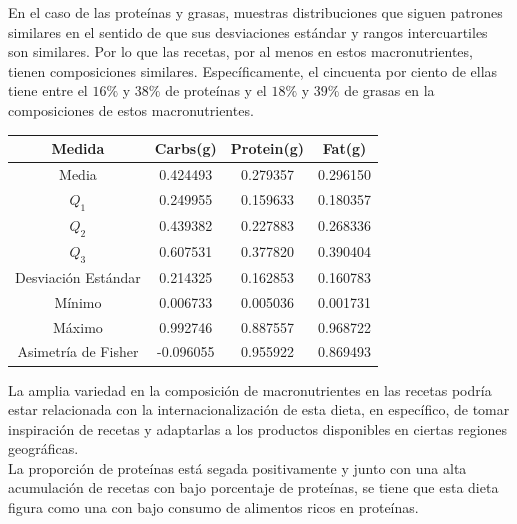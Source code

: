 \documentclass[12pt,a4paper]{article}
\begin{document}
            En el caso de las proteínas y grasas, muestras distribuciones que siguen 
            patrones similares en el sentido de que sus desviaciones estándar y rangos 
            intercuartiles son similares. Por lo que las recetas, por al menos en estos 
            macronutrientes, tienen composiciones similares. Específicamente, el cincuenta 
            por ciento de ellas tiene entre el $16\%$ y $38\%$ de proteínas	y el $18\%$ y 
            $39\%$ de grasas en la composiciones de estos macronutrientes.

            \begin{center}
                \begin{tabular}{| c | c c c |}
                    \toprule
                    Medida & Carbs(g) & Protein(g) & Fat(g) \\
                    \midrule
                    Media               & 0.424493 & 0.279357 & 0.296150  \\
                    $Q_1$               & 0.249955 & 0.159633 & 0.180357  \\
                    $Q_2$               & 0.439382 & 0.227883 & 0.268336  \\
                    $Q_3$               & 0.607531 & 0.377820 & 0.390404  \\
                    Desviación Estándar & 0.214325 & 0.162853 & 0.160783  \\
                    Mínimo              & 0.006733 & 0.005036 & 0.001731  \\
                    Máximo              & 0.992746 & 0.887557 & 0.968722  \\
                    Asimetría de Fisher & -0.096055 & 0.955922 & 0.869493 \\
                    \bottomrule
                \end{tabular}
            \end{center}

            La amplia variedad en la composición de macronutrientes en las recetas podría 
            estar relacionada con la internacionalización de esta dieta, en específico, de 
            tomar inspiración de recetas y adaptarlas a los productos disponibles en 
            ciertas regiones geográficas.\\

            La proporción de proteínas está segada positivamente y junto con una 
            alta acumulación de recetas con bajo porcentaje de proteínas, se tiene que 
            esta dieta figura como una con bajo consumo de alimentos ricos en proteínas. 
            
\end{document}
